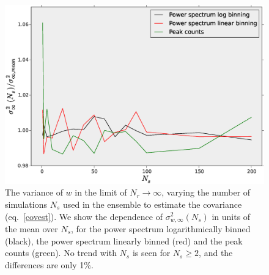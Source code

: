 \documentclass[reprint,aps,prd,superscriptaddress,showkeys,showpacs]{revtex4-1}
\begin{document}
\begin{figure}
\includegraphics[scale=0.3]{Figures/scaling_ns.eps}
\caption{The variance of $w$ in the limit of $N_r\rightarrow\infty$,
  varying the number of simulations $N_s$ used in the ensemble to
  estimate the covariance (eq.~\ref{covest}). We show the dependence
  of $\sigma_{w,\infty}^2(N_s)$ in units of the mean over $N_s$, 
  for
  the power spectrum logarithmically binned (black), the power
  spectrum linearly binned (red) and the peak counts (green).
  No trend with $N_s$ is seen for $N_s\geq 2$, and the
  differences are only 1\%.  }
\label{wvar_ns}
\end{figure}
\end{document}
